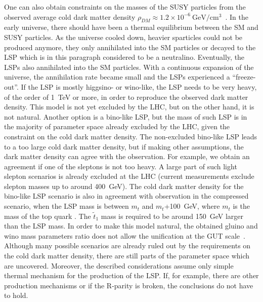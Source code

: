 One can also obtain constraints on the masses of the SUSY particles from the observed average cold dark matter density $\rho_{DM} \approx 1.2 \times 10^{-6}~\mathrm{GeV/cm^{3}}$~\cite{Ade:2015xua, Patrignani:2016xqp}.  In the early universe, there should have been a  thermal equilibrium between the SM and SUSY particles. As the universe cooled down, heavier sparticles could not be produced anymore, they only annihilated into the SM particles or decayed to the LSP which is in this paragraph considered to be a neutralino. Eventually, the LSPs also annihilated into the SM particles. With a continuous expansion of the universe, the annihilation rate became small and the LSPs experienced a ``freeze-out''. If the LSP is mostly higgsino- or wino-like, the LSP needs to be very heavy, of the order of 1~TeV or more, in order to reproduce the observed dark matter density. This model is not yet excluded by the LHC, but on the other hand, it is not natural. Another option is a bino-like LSP, but the mass of such LSP is in the majority of parameter space already excluded by the LHC, given the constraint on the cold dark matter density. The non-excluded bino-like LSP leads to a too large cold dark matter density, but if making other assumptions, the  dark matter density can agree with the observation.  For example, we obtain an agreement if one of the sleptons is not too heavy.  A large part of such light slepton scenarios is already excluded at the LHC (current measurements exclude slepton masses up to around 400~GeV). The cold dark matter density for the bino-like LSP scenario is also in agreement with observation in the compressed scenario, when the LSP mass is between $m_{t}$ and $m_{t}$+100~GeV, where $m_{t}$ is the mass of the top quark . The $\tilde{t}_{1}$ mass is required to be around 150~GeV larger than the LSP mass. In order to make this  model natural, the obtained gluino and wino mass parameters ratio does not allow the unification at the GUT scale~\cite{Martin:2008aw}. Although many possible scenarios are already ruled out by the requirements on the cold dark matter density, there are still parts of the parameter space which are uncovered. Moreover, the described considerations assume only simple thermal mechanism for the production of the LSP. If, for example, there are other production mechanisms or if the R-parity is broken, the conclusions do not have to hold.

